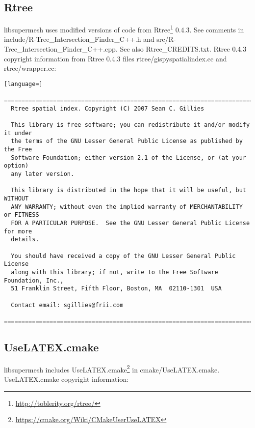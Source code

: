 \documentclass{article}
\begin{document}
\subsection{Rtree}

libsupermesh uses modified versions of code from
Rtree\footnote{\url{http://toblerity.org/rtree/}} 0.4.3. See comments in
\linebreak include/R-Tree\_Intersection\_Finder\_C++.h and
src/R-Tree\_Intersection\_Finder\_C++.cpp. See also \linebreak
Rtree\_CREDITS.txt. Rtree 0.4.3 copyright information from Rtree 0.4.3 files
rtree/gispyspatialindex.cc and rtree/wrapper.cc:

\begin{lstlisting}[language=]
  =============================================================================
  Rtree spatial index. Copyright (C) 2007 Sean C. Gillies
 
  This library is free software; you can redistribute it and/or modify it under
  the terms of the GNU Lesser General Public License as published by the Free
  Software Foundation; either version 2.1 of the License, or (at your option)
  any later version.
 
  This library is distributed in the hope that it will be useful, but WITHOUT
  ANY WARRANTY; without even the implied warranty of MERCHANTABILITY or FITNESS
  FOR A PARTICULAR PURPOSE.  See the GNU Lesser General Public License for more
  details.
 
  You should have received a copy of the GNU Lesser General Public License 
  along with this library; if not, write to the Free Software Foundation, Inc.,
  51 Franklin Street, Fifth Floor, Boston, MA  02110-1301  USA
 
  Contact email: sgillies@frii.com
  =============================================================================
\end{lstlisting}

\subsection{UseLATEX.cmake}

libsupermesh includes
UseLATEX.cmake\footnote{\url{https://cmake.org/Wiki/CMakeUserUseLATEX}} in
cmake/UseLATEX.cmake. UseLATEX.cmake copyright information:
\end{document}
